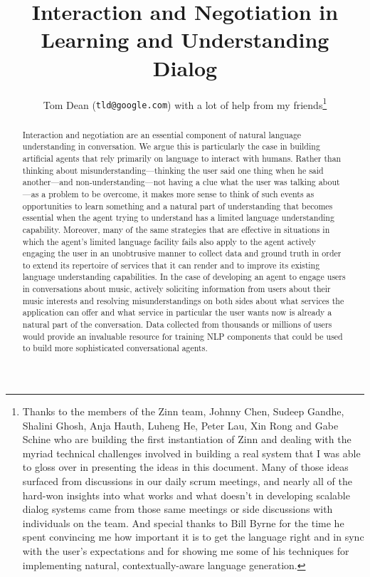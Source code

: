 \documentclass[letterpaper,11pt]{article}
\date{}
\begin{document}
\title{Interaction and Negotiation in\\Learning and Understanding Dialog}

\author{Tom Dean ({\tt{tld@google.com}}) with a lot of help from my friends\footnote{%
%
  Thanks to the members of the Zinn team, Johnny Chen, Sudeep Gandhe, Shalini Ghosh, Anja Hauth, Luheng He, Peter Lau, Xin Rong and Gabe Schine who are building the first instantiation of Zinn and dealing with the myriad technical challenges involved in building a real system that I was able to gloss over in presenting the ideas in this document.
%
  Many of those ideas surfaced from discussions in our daily scrum meetings, and nearly all of the hard-won insights into what works and what doesn't in developing scalable dialog systems came from those same meetings or side discussions with individuals on the team.  
%
  And special thanks to Bill Byrne for the time he spent convincing me how important it is to get the language right and in sync with the user's expectations and for showing me some of his techniques for implementing natural, contextually-aware language generation.}}

\maketitle

\begin{abstract}
%
  Interaction and negotiation are an essential component of natural language understanding in conversation. We argue this is particularly the case in building artificial agents that rely primarily on language to interact with humans. Rather than thinking about misunderstanding---thinking the user said one thing when he said another---and non-understanding---not having a clue what the user was talking about---as a problem to be overcome, it makes more sense to think of such events as opportunities to learn something and a natural part of understanding that becomes essential when the agent trying to understand has a limited language understanding capability. Moreover, many of the same strategies that are effective in situations in which the agent's limited language facility fails also apply to the agent actively engaging the user in an unobtrusive manner to collect data and ground truth in order to extend its repertoire of services that it can render and to improve its existing language understanding capabilities. In the case of developing an agent to engage users in conversations about music, actively soliciting information from users about their music interests and resolving misunderstandings on both sides about what services the application can offer and what service in particular the user wants now is already a natural part of the conversation. Data collected from thousands or millions of users would provide an invaluable resource for training NLP components that could be used to build more sophisticated conversational agents.
% 
\end{abstract}
\end{document}

